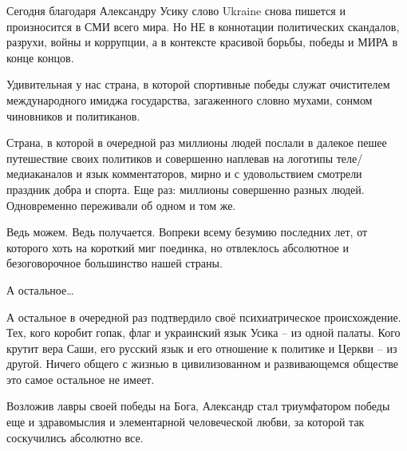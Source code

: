 Сегодня благодаря Александру Усику слово Ukraine снова пишется и произносится в
СМИ всего мира. Но НЕ в коннотации политических скандалов, разрухи, войны и
коррупции, а в контексте красивой борьбы, победы и МИРА в конце концов.

Удивительная у нас страна, в которой спортивные победы служат очистителем
международного имиджа государства, загаженного словно мухами, сонмом чиновников
и политиканов.

Страна, в которой в очередной раз миллионы людей послали в далекое пешее
путешествие своих политиков и совершенно наплевав на логотипы теле/медиаканалов
и язык комментаторов, мирно и с удовольствием смотрели праздник добра и спорта.
Еще раз: миллионы совершенно разных людей. Одновременно переживали об одном и
том же. 

Ведь можем. Ведь получается. Вопреки всему безумию последних лет, от которого
хоть на короткий миг поединка, но отвлеклось абсолютное и безоговорочное
большинство нашей страны.

А остальное…

А остальное в очередной раз подтвердило своё психиатрическое происхождение.
Тех, кого коробит гопак, флаг и украинский язык Усика – из одной палаты. Кого
крутит вера Саши, его русский язык и его отношение к политике и Церкви – из
другой. Ничего общего с жизнью в цивилизованном и развивающемся обществе это
самое остальное не имеет.

Возложив лавры своей победы на Бога, Александр стал триумфатором победы еще и
здравомыслия и элементарной человеческой любви, за которой так соскучились
абсолютно все.

